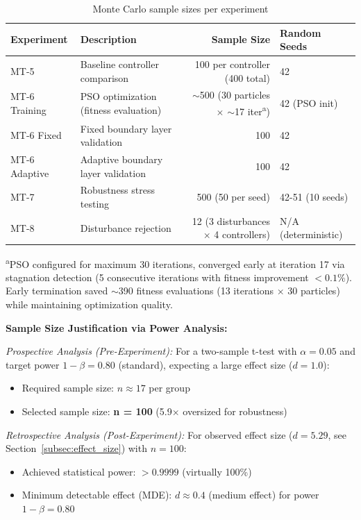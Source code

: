 \begin{table}[t]
\centering
\caption{Monte Carlo sample sizes per experiment}
\label{tab:monte_carlo_samples}
\begin{tabular}{llrl}
\toprule
\textbf{Experiment} & \textbf{Description} & \textbf{Sample Size} & \textbf{Random Seeds} \\
\midrule
MT-5 & Baseline controller comparison & 100 per controller (400 total) & 42 \\
MT-6 Training & PSO optimization (fitness evaluation) & $\sim$500 (30 particles $\times$ $\sim$17 iter\textsuperscript{a}) & 42 (PSO init) \\
MT-6 Fixed & Fixed boundary layer validation & 100 & 42 \\
MT-6 Adaptive & Adaptive boundary layer validation & 100 & 42 \\
MT-7 & Robustness stress testing & 500 (50 per seed) & 42-51 (10 seeds) \\
MT-8 & Disturbance rejection & 12 (3 disturbances $\times$ 4 controllers) & N/A (deterministic) \\
\bottomrule
\end{tabular}
\parbox{\textwidth}{\footnotesize \textsuperscript{a}PSO configured for maximum 30 iterations, converged early at iteration 17 via stagnation detection (5 consecutive iterations with fitness improvement $< 0.1\%$). Early termination saved $\sim$390 fitness evaluations (13 iterations $\times$ 30 particles) while maintaining optimization quality.}
\end{table}

\textbf{Sample Size Justification via Power Analysis:}

\textit{Prospective Analysis (Pre-Experiment):}
For a two-sample t-test with $\alpha=0.05$ and target power $1-\beta=0.80$ (standard), expecting a large effect size ($d=1.0$):
\begin{itemize}
    \item Required sample size: $n \approx 17$ per group~\cite{cohen1988statistical}
    \item Selected sample size: \textbf{n = 100} (5.9$\times$ oversized for robustness)
\end{itemize}

\textit{Retrospective Analysis (Post-Experiment):}
For observed effect size ($d=5.29$, see Section~\ref{subsec:effect_size}) with $n=100$:
\begin{itemize}
    \item Achieved statistical power: $> 0.9999$ (virtually 100\%)
    \item Minimum detectable effect (MDE): $d \approx 0.4$ (medium effect) for power $1-\beta=0.80$
\end{itemize}

